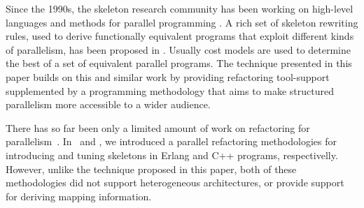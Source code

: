 \documentclass[smallextended]{svjour3}
\begin{document}
Since the 1990s, the skeleton research community has been
working on high-level languages and methods for parallel programming
\cite{cole-th}.
A rich set of skeleton rewriting rules, used to derive functionally equivalent programs that exploit different kinds of parallelism, has been proposed in \cite{aldinuc:stream-data:98,FAN:PPA:01,SkillicornC95}. Usually cost models are used to determine the best of a set of equivalent parallel programs.
The technique presented in this paper builds on this
and similar work by providing refactoring tool-support
supplemented by a programming methodology that
aims to make structured parallelism more accessible to a wider audience.

%
There has so far been only a limited amount of work on refactoring for parallelism~\cite{fmcoover}. 
In~\cite{hlpp} and \cite{pdp}, we introduced a parallel refactoring methodologies
for introducing and tuning skeletons in Erlang and C++ programs, respectivelly. 
However, unlike the technique proposed in this paper, both of these methodologies did not support
heterogeneous architectures, or provide support for deriving mapping information.
\end{document}
